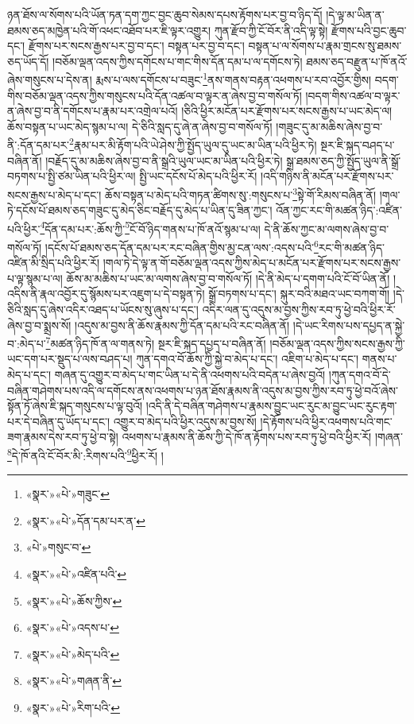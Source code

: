 ཉན་ཐོས་ལ་སོགས་པའི་ཡོན་ཏན་དག་ཀྱང་བྱང་ཆུབ་སེམས་དཔས་རྟོགས་པར་བྱ་བ་ཉིད་དོ། །དེ་ལྟ་མ་ཡིན་ན་ཐམས་ཅད་མཁྱེན་པའི་གོ་འཕང་འཐོབ་པར་ཇི་ལྟར་འགྱུར། ཀུན་རྫོབ་ཀྱི་ངོ་བོར་ནི་འདི་ལྟ་སྟེ། རྫོགས་པའི་བྱང་ཆུབ་དང་། རྫོགས་པར་སངས་རྒྱས་པར་བྱ་བ་དང་། བསྟན་པར་བྱ་བ་དང་། བསྟན་པ་ལ་སོགས་པ་རྣམ་གྲངས་སུ་ཐམས་ཅད་ཡོད་དོ། །བཅོམ་ལྡན་འདས་ཀྱིས་དགོངས་པ་གང་གིས་དོན་དམ་པ་ལ་དགོངས་ཏེ། ཐམས་ཅད་བརྫུན་པ་ཁོ་ནའོ་ཞེས་གསུངས་པ་དེས་ན། རྨས་པ་ལས་དགོངས་པ་བཟུང་\footnote{«སྣར་»«པེ་»གཟུང་}ནས་གནས་བརྟན་འཕགས་པ་རབ་འབྱོར་གྱིས། བདག་གིས་བཅོམ་ལྡན་འདས་ཀྱིས་གསུངས་པའི་དོན་འཚལ་བ་ལྟར་ན་ཞེས་བྱ་བ་གསོལ་ཏོ། །བདག་གིས་འཚལ་བ་ལྟར་ན་ཞེས་བྱ་བ་ནི་དགོངས་པ་རྣམ་པར་འགྲེལ་པའོ། །ཅིའི་ཕྱིར་མངོན་པར་རྫོགས་པར་སངས་རྒྱས་པ་ཡང་མེད་ལ། ཆོས་བསྟན་པ་ཡང་མེད་སྙམ་པ་ལ། དེ་ཅིའི་སླད་དུ་ཞེ་ན་ཞེས་བྱ་བ་གསོལ་ཏོ། །གཟུང་དུ་མ་མཆིས་ཞེས་བྱ་བ་ནི་:དོན་དམ་པར་\footnote{«སྣར་»«པེ་»དོན་དམ་པར་ན་}རྣམ་པར་མི་རྟོག་པའི་ཡེ་ཤེས་ཀྱི་སྤྱོད་ཡུལ་དུ་ཡང་མ་ཡིན་པའི་ཕྱིར་ཏེ། སྔར་ཇི་སྐད་བཤད་པ་བཞིན་ནོ། །བརྗོད་དུ་མ་མཆིས་ཞེས་བྱ་བ་ནི་སྒྲའི་ཡུལ་ཡང་མ་ཡིན་པའི་ཕྱིར་ཏེ། སྒྲ་ཐམས་ཅད་ཀྱི་སྤྱོད་ཡུལ་ནི་སྒྲོ་བཏགས་པ་སྤྱི་ཙམ་ཡིན་པའི་ཕྱིར་ལ། སྤྱི་ཡང་དངོས་པོ་མེད་པའི་ཕྱིར་རོ། །འདི་གཉིས་ནི་མངོན་པར་རྫོགས་པར་སངས་རྒྱས་པ་མེད་པ་དང་། ཆོས་བསྟན་པ་མེད་པའི་གཏན་ཚིགས་སུ་:གསུངས་པ་\footnote{«པེ་»གསུང་བ་}སྟེ་གོ་རིམས་བཞིན་ནོ། །གལ་ཏེ་དངོས་པོ་ཐམས་ཅད་གཟུང་དུ་མེད་ཅིང་བརྗོད་དུ་མེད་པ་ཡིན་དུ་ཟིན་ཀྱང་། འོན་ཀྱང་རང་གི་མཚན་ཉིད་:འཛིན་པའི་ཕྱིར་\footnote{«སྣར་»«པེ་»འཛིན་པའི་}དོན་དམ་པར་:ཆོས་ཀྱི་\footnote{«སྣར་»«པེ་»ཆོས་ཀྱིས་}ངོ་བོ་ཉིད་གནས་པ་ཁོ་ནའོ་སྙམ་པ་ལ། དེ་ནི་ཆོས་ཀྱང་མ་ལགས་ཞེས་བྱ་བ་གསོལ་ཏོ། །དངོས་པོ་ཐམས་ཅད་དོན་དམ་པར་རང་བཞིན་གྱིས་མྱ་ངན་ལས་:འདས་པའི་\footnote{«སྣར་»«པེ་»འདས་པ་}རང་གི་མཚན་ཉིད་འཛིན་མི་སྲིད་པའི་ཕྱིར་རོ། །གལ་ཏེ་དེ་ལྟ་ན་གོ་བཅོམ་ལྡན་འདས་ཀྱིས་མེད་པ་མངོན་པར་རྫོགས་པར་སངས་རྒྱས་པ་ལྟ་སྙམ་པ་ལ། ཆོས་མ་མཆིས་པ་ཡང་མ་ལགས་ཞེས་བྱ་བ་གསོལ་ཏོ། །དེ་ནི་མེད་པ་དགག་པའི་ངོ་བོ་ཡིན་ནོ། །འདིས་ནི་རྣལ་འབྱོར་དུ་སྙོམས་པར་འཇུག་པ་དེ་བསྟན་ཏེ། སྒྲོ་བཏགས་པ་དང་། སྐུར་བའི་མཐའ་ཡང་བཀག་གོ། །དེ་ཅིའི་སླད་དུ་ཞེས་འདིར་འཐད་པ་ཡོངས་སུ་ཞུས་པ་དང་། འདིར་ལན་དུ་འདུས་མ་བྱས་ཀྱིས་རབ་ཏུ་ཕྱེ་བའི་ཕྱིར་རོ་ཞེས་བྱ་བ་སྨྲས་སོ། །འདུས་མ་བྱས་ནི་ཆོས་རྣམས་ཀྱི་དོན་དམ་པའི་རང་བཞིན་ནོ། །དེ་ཡང་རིགས་པས་དཔྱད་ན་སྐྱེ་བ་:མེད་པ་\footnote{«སྣར་»«པེ་»མེད་པའི་}མཚན་ཉིད་ཁོ་ན་ལ་གནས་ཏེ། སྔར་ཇི་སྐད་དཔྱད་པ་བཞིན་ནོ། །བཅོམ་ལྡན་འདས་ཀྱིས་སངས་རྒྱས་ཀྱི་ཡང་དག་པར་སྡུད་པ་ལས་བཤད་པ། ཀུན་དགའ་བོ་ཆོས་ཀྱི་སྐྱེ་བ་མེད་པ་དང་། འཇིག་པ་མེད་པ་དང་། གནས་པ་མེད་པ་དང་། གཞན་དུ་འགྱུར་བ་མེད་པ་གང་ཡིན་པ་དེ་ནི་འཕགས་པའི་བདེན་པ་ཞེས་བྱའོ། །ཀུན་དགའ་བོ་དེ་བཞིན་གཤེགས་པས་འདི་ལ་དགོངས་ནས་འཕགས་པ་ཉན་ཐོས་རྣམས་ནི་འདུས་མ་བྱས་ཀྱིས་རབ་ཏུ་ཕྱེ་བའོ་ཞེས་སྟོན་ཏོ་ཞེས་ཇི་སྐད་གསུངས་པ་ལྟ་བུའོ། །འདི་ནི་དེ་བཞིན་གཤེགས་པ་རྣམས་བྱུང་ཡང་རུང་མ་བྱུང་ཡང་རུང་རྟག་པར་དེ་བཞིན་དུ་ཡོད་པ་དང་། འགྱུར་བ་མེད་པའི་ཕྱིར་འདུས་མ་བྱས་སོ། །དེ་རྟོགས་པའི་ཕྱིར་འཕགས་པའི་གང་ཟག་རྣམས་དེས་རབ་ཏུ་ཕྱེ་བ་སྟེ། འཕགས་པ་རྣམས་ནི་ཆོས་ཀྱི་དེ་ཁོ་ན་རྟོགས་པས་རབ་ཏུ་ཕྱེ་བའི་ཕྱིར་རོ། །གཞན་\footnote{«སྣར་»«པེ་»གཞན་ནི་}དེ་ཁོ་ནའི་ངོ་བོར་མི་:རིགས་པའི་\footnote{«སྣར་»«པེ་»རིག་པའི་}ཕྱིར་རོ། །
